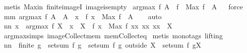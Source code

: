 \begin{isabellebody}
\ {\isacharparenleft}metis\ Max{\isacharunderscore}in\ finite{\isacharunderscore}imageI\ image{\isacharunderscore}is{\isacharunderscore}empty{\isacharparenright}%
\endisatagproof
{\isafoldproof}%
%
\isadelimproof
\isanewline
%
\endisadelimproof
\isanewline
{}\isamarkupfalse%
\ {\isachardoublequoteopen}argmax\ f\ A\ {\isasymsubseteq}\ f\ {\isacharminus}{\isacharbackquote}\ {\isacharbraceleft}Max\ {\isacharparenleft}f\ {\isacharbackquote}\ A{\isacharparenright}{\isacharbraceright}{\isachardoublequoteclose}%
\isadelimproof
\ %
\endisadelimproof
%
\isatagproof
{}\isamarkupfalse%
\ force%
\endisatagproof
{\isafoldproof}%
%
\isadelimproof
%
\endisadelimproof
\isanewline
\isanewline
{}\isamarkupfalse%
\ mm{}{}{\isacharcolon}\ {\isachardoublequoteopen}argmax\ f\ A\ {\isacharequal}\ A\ {\isasyminter}{\isacharbraceleft}\ x\ {\isachardot}\ f\ x\ {\isacharequal}\ Max\ {\isacharparenleft}f\ {\isacharbackquote}\ A{\isacharparenright}\ {\isacharbraceright}{\isachardoublequoteclose}%
\isadelimproof
\ %
\endisadelimproof
%
\isatagproof
{}\isamarkupfalse%
\ auto%
\endisatagproof
{\isafoldproof}%
%
\isadelimproof
%
\endisadelimproof
\isanewline
\isanewline
{}\isamarkupfalse%
\ nn{}{}{\isacharcolon}\ {\isachardoublequoteopen}{\isacharparenleft}x\ {\isasymin}\ argmax\ f\ X{\isacharparenright}\ {\isacharequal}\ {\isacharparenleft}x\ {\isasymin}\ X\ {\isacharampersand}\ f\ x\ {\isacharequal}\ Max\ {\isacharbraceleft}f\ xx{\isacharbar}\ xx{\isachardot}\ xx\ {\isasymin}\ X{\isacharbraceright}{\isacharparenright}{\isachardoublequoteclose}\ \isanewline
%
\isadelimproof
%
\endisadelimproof
%
\isatagproof
{}\isamarkupfalse%
\ argmax{\isachardot}simps\ image{\isacharunderscore}Collect{\isacharunderscore}mem\ mem{\isacharunderscore}Collect{\isacharunderscore}eq\isanewline
{}\isamarkupfalse%
\ {\isacharparenleft}metis\ {\isacharparenleft}mono{\isacharunderscore}tags{\isacharcomma}\ lifting{\isacharparenright}{\isacharparenright}%
\endisatagproof
{\isafoldproof}%
%
\isadelimproof
\isanewline
%
\endisadelimproof
\isanewline
{}\isamarkupfalse%
\ nn{}{}{\isacharcolon}\ \ {\isachardoublequoteopen}finite\ g{\isachardoublequoteclose}\ \ {\isachardoublequoteopen}setsum\ f\ g\ {\isacharequal}\ setsum\ f\ {\isacharparenleft}g\ outside\ X{\isacharparenright}\ {\isacharplus}\ {\isacharparenleft}setsum\ f\ {\isacharparenleft}g{\isacharbar}{\isacharbar}X{\isacharparenright}{\isacharparenright}{\isachardoublequoteclose}\ \isanewline

\end{isabellebody}

